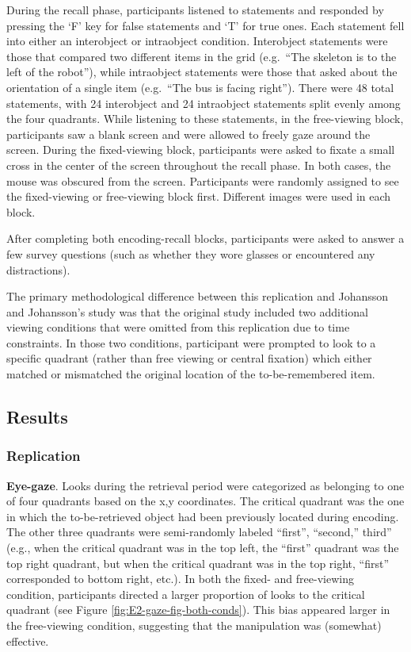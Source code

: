 \documentclass[
  man,floatsintext]{apa6}
\begin{document}
During the recall phase, participants listened to statements and
responded by pressing the `F' key for false statements and `T' for true
ones. Each statement fell into either an interobject or intraobject
condition. Interobject statements were those that compared two different
items in the grid (e.g.~``The skeleton is to the left of the robot''),
while intraobject statements were those that asked about the orientation
of a single item (e.g.~``The bus is facing right''). There were 48 total
statements, with 24 interobject and 24 intraobject statements split
evenly among the four quadrants. While listening to these statements, in
the free-viewing block, participants saw a blank screen and were allowed
to freely gaze around the screen. During the fixed-viewing block,
participants were asked to fixate a small cross in the center of the
screen throughout the recall phase. In both cases, the mouse was
obscured from the screen. Participants were randomly assigned to see the
fixed-viewing or free-viewing block first. Different images were used in each block.

After completing both encoding-recall blocks, participants were asked to
answer a few survey questions (such as whether they wore glasses or
encountered any distractions).

The primary methodological difference between this replication and
Johansson and Johansson's study was that the original study included two
additional viewing conditions that were omitted from this replication
due to time constraints. In those two conditions, participant were
prompted to look to a specific quadrant (rather than free viewing or
central fixation) which either matched or mismatched the original
location of the to-be-remembered item.

\subsection{Results}\label{results-1}

\subsubsection{Replication}\label{replication}

\textbf{Eye-gaze}. Looks during the retrieval period were categorized as belonging to one of four quadrants based on the x,y coordinates. The critical quadrant was the one in which the to-be-retrieved object had been previously located during encoding. The other three quadrants were semi-randomly labeled ``first'', ``second,'' third'' (e.g., when the critical quadrant was in the top left, the ``first'' quadrant was the top right quadrant, but when the critical quadrant was in the top right, ``first'' corresponded to bottom right, etc.). In both the fixed- and free-viewing condition, participants directed a larger proportion of looks to the critical quadrant (see Figure \ref{fig:E2-gaze-fig-both-conds}). This bias appeared larger in the free-viewing condition, suggesting that the manipulation was (somewhat) effective.
\end{document}
